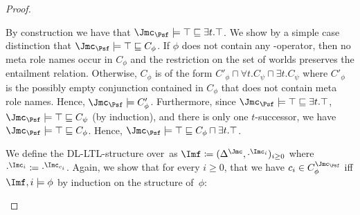 \begin{proof}
\begin{claimproof}
    By construction we have that $\J_{\Psf}\models\top\sqsubseteq\exists t.\top$.  We show by a
    simple case distinction that $\J_{\Psf}\models\top\sqsubseteq C_\phi$.
    If $\phi$ does not contain any \Next-operator, then no meta role names occur in $C_{\phi}$ and
    the restriction on the set of worlds preserves the entailment relation. Otherwise, $C_{\phi}$ is
    of the form $C'_{\phi} \sqcap \forall t.C_\psi\sqcap\exists t.C_\psi$ where $C'_{\phi}$ is the
    possibly empty conjunction contained in $C_{\phi}$ that does not contain meta role names. Hence,
    $\J_{\Psf}\models C'_{\phi}$. Furthermore, since
    $\J_{\Psf}\models\top\sqsubseteq\exists t.\top$, $\J_{\Psf}\models\top\sqsubseteq C_\psi$ (by induction), and
    there is only one $t$-successor, we have $\J_{\Psf}\models\top\sqsubseteq C_\phi$.  Hence,
    $\J_{\Psf}\models\top\sqsubseteq C_{\phi}\sqcap\exists t.\top$.
    
    We define the DL-LTL-structure \Imf over~\Osig as
    $\Imf\coloneqq(\Delta^{\J},\cdot^{\I_i})_{i\ge 0}$ where
    $\cdot^{\I_{i}}\coloneqq\cdot^{\I_{c_{i}}}$.
    Again, we show that for every $i \geq 0$, that we have $c_i \in C_{\phi}^{\J_{\Psf}}$ iff
    $\Imf,i\models\phi$ by induction on the structure of~$\phi$:


\end{claimproof}
\end{proof}
